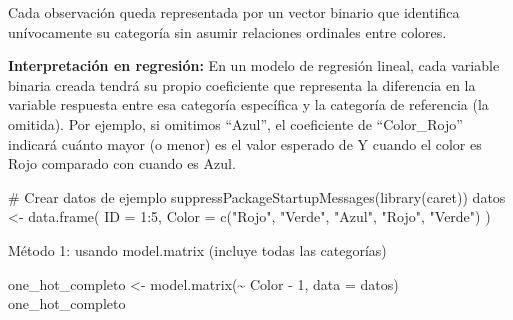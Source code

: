 \documentclass[
  letterpaper,
  DIV=11,
  numbers=noendperiod]{scrreprt}
\newenvironment{Shaded}{\begin{snugshade}}{\end{snugshade}}
\newcommand{\AttributeTok}[1]{\textcolor[rgb]{0.40,0.45,0.13}{#1}}
\newcommand{\CommentTok}[1]{\textcolor[rgb]{0.37,0.37,0.37}{#1}}
\newcommand{\DecValTok}[1]{\textcolor[rgb]{0.68,0.00,0.00}{#1}}
\newcommand{\FunctionTok}[1]{\textcolor[rgb]{0.28,0.35,0.67}{#1}}
\newcommand{\NormalTok}[1]{\textcolor[rgb]{0.00,0.23,0.31}{#1}}
\newcommand{\OtherTok}[1]{\textcolor[rgb]{0.00,0.23,0.31}{#1}}
\newcommand{\SpecialCharTok}[1]{\textcolor[rgb]{0.37,0.37,0.37}{#1}}
\newcommand{\StringTok}[1]{\textcolor[rgb]{0.13,0.47,0.30}{#1}}
\begin{document}
Cada observación queda representada por un vector binario que identifica
unívocamente su categoría sin asumir relaciones ordinales entre colores.

\textbf{Interpretación en regresión:} En un modelo de regresión lineal,
cada variable binaria creada tendrá su propio coeficiente que representa
la diferencia en la variable respuesta entre esa categoría específica y
la categoría de referencia (la omitida). Por ejemplo, si omitimos
``Azul'', el coeficiente de ``Color\_Rojo'' indicará cuánto mayor (o
menor) es el valor esperado de Y cuando el color es Rojo comparado con
cuando es Azul.

\begin{tcolorbox}[enhanced jigsaw, leftrule=.75mm, breakable, colbacktitle=quarto-callout-tip-color!10!white, bottomrule=.15mm, colframe=quarto-callout-tip-color-frame, toprule=.15mm, colback=white, coltitle=black, bottomtitle=1mm, left=2mm, title=\textcolor{quarto-callout-tip-color}{\faLightbulb}\hspace{0.5em}{Implementación práctica}, opacityback=0, arc=.35mm, opacitybacktitle=0.6, toptitle=1mm, titlerule=0mm, rightrule=.15mm]

\begin{Shaded}
\begin{Highlighting}[]
\CommentTok{\# Crear datos de ejemplo}
\FunctionTok{suppressPackageStartupMessages}\NormalTok{(}\FunctionTok{library}\NormalTok{(caret))}
\NormalTok{datos }\OtherTok{\textless{}{-}} \FunctionTok{data.frame}\NormalTok{(}
  \AttributeTok{ID =} \DecValTok{1}\SpecialCharTok{:}\DecValTok{5}\NormalTok{,}
  \AttributeTok{Color =} \FunctionTok{c}\NormalTok{(}\StringTok{"Rojo"}\NormalTok{, }\StringTok{"Verde"}\NormalTok{, }\StringTok{"Azul"}\NormalTok{, }\StringTok{"Rojo"}\NormalTok{, }\StringTok{"Verde"}\NormalTok{)}
\NormalTok{)}
\end{Highlighting}
\end{Shaded}

Método 1: usando model.matrix (incluye todas las categorías)

\begin{Shaded}
\begin{Highlighting}[]
\NormalTok{one\_hot\_completo }\OtherTok{\textless{}{-}} \FunctionTok{model.matrix}\NormalTok{(}\SpecialCharTok{\textasciitilde{}}\NormalTok{ Color }\SpecialCharTok{{-}} \DecValTok{1}\NormalTok{, }\AttributeTok{data =}\NormalTok{ datos)}
\NormalTok{one\_hot\_completo}
\end{Highlighting}
\end{Shaded}


\end{tcolorbox}
\end{document}
